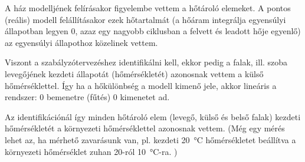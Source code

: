 A ház modelljének felírásakor figyelembe vettem a hőtároló elemeket. A pontos (reális) modell felállításakor ezek hőtartalmát (a hőáram integrálja egyensúlyi állapotban legyen 0, azaz egy nagyobb ciklusban a felvett és leadott hője egyenlő) az egyensúlyi állapothoz közelinek vettem.

Viszont a szabályzótervezéshez identifikálni kell, ekkor pedig a falak, ill. szoba levegőjének kezdeti állapotát (hőmérsékletét) azonosnak vettem a külső hőmérséklettel. Így ha a hőkülönbség a modell kimenő jele, akkor lineáris a rendszer: 0 bemenetre (fűtés) 0 kimenetet ad.

Az identifikációnál így minden hőtároló elem (levegő, külső és belső falak) kezdeti hőmérsékletét a környezeti hőmérséklettel azonosnak vettem.
(Még egy mérés lehet az, ha mérhető zavarásunk van, pl. kezdeti \SI{20}{\celsius} hőmérsékletet beállítva a környezeti hőmérséklet zuhan 20-ról \SI{10}{\celsius}-ra. )



\pagebreak